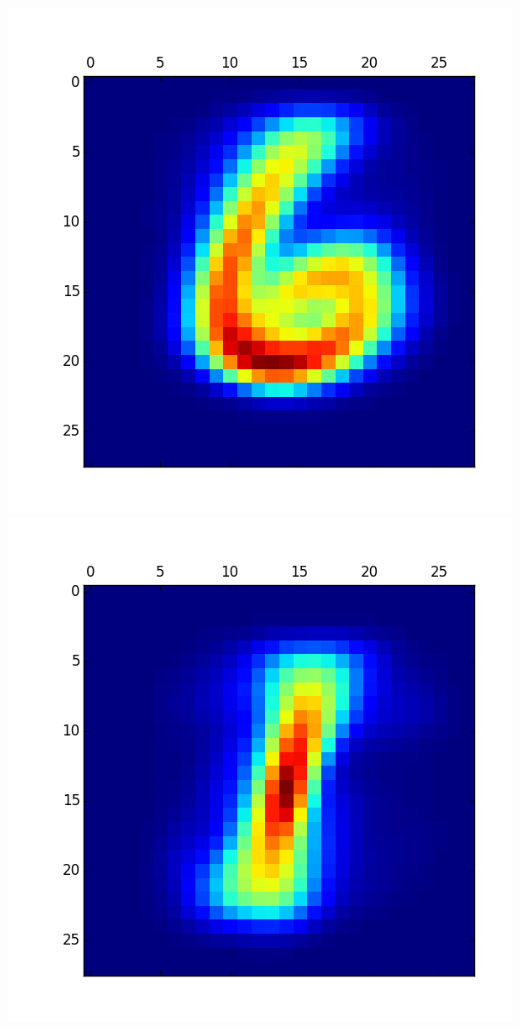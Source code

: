 \documentclass[11pt]{article}
\begin{document}
\begin{itemize}
\includegraphics[scale = 0.5]{8.png}
\includegraphics[scale = 0.5]{9.png}


\end{itemize}
\end{document}
